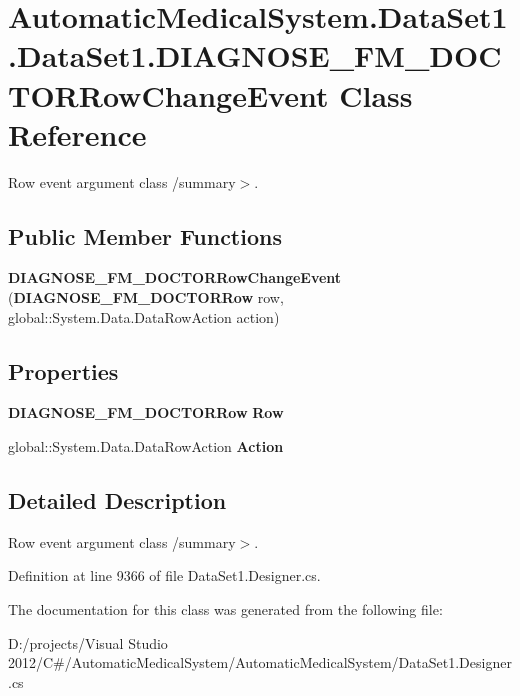 \section{AutomaticMedicalSystem.DataSet1.DataSet1.DIAGNOSE\_\-FM\_\-DOCTORRowChangeEvent Class Reference}
\label{class_automatic_medical_system_1_1_data_set1_1_1_d_i_a_g_n_o_s_e___f_m___d_o_c_t_o_r_row_change_event}
Row event argument class /summary$>$.  


\subsection*{Public Member Functions}
\begin{CompactItemize}
\item 
\textbf{DIAGNOSE\_\-FM\_\-DOCTORRowChangeEvent} ({\bf DIAGNOSE\_\-FM\_\-DOCTORRow} row, global::System.Data.DataRowAction action)\label{class_automatic_medical_system_1_1_data_set1_1_1_d_i_a_g_n_o_s_e___f_m___d_o_c_t_o_r_row_change_event_f238dd668bd51f5e460efcd203475eac}

\end{CompactItemize}
\subsection*{Properties}
\begin{CompactItemize}
\item 
{\bf DIAGNOSE\_\-FM\_\-DOCTORRow} \textbf{Row}\hspace{0.3cm}{\tt  [get]}\label{class_automatic_medical_system_1_1_data_set1_1_1_d_i_a_g_n_o_s_e___f_m___d_o_c_t_o_r_row_change_event_215de1a405d1d1e373c52fe9df995b6d}

\item 
global::System.Data.DataRowAction \textbf{Action}\hspace{0.3cm}{\tt  [get]}\label{class_automatic_medical_system_1_1_data_set1_1_1_d_i_a_g_n_o_s_e___f_m___d_o_c_t_o_r_row_change_event_c388edffea71460ad704acea00a2963c}

\end{CompactItemize}


\subsection{Detailed Description}
Row event argument class /summary$>$. 

Definition at line 9366 of file DataSet1.Designer.cs.

The documentation for this class was generated from the following file:\begin{CompactItemize}
\item 
D:/projects/Visual Studio 2012/C\#/AutomaticMedicalSystem/AutomaticMedicalSystem/DataSet1.Designer.cs\end{CompactItemize}
